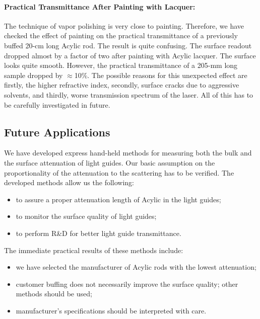 \paragraph{Practical Transmittance After Painting with Lacquer:}
The technique of vapor polishing is very close to painting.  Therefore, we have 
checked the effect of painting on the practical transmittance of a previously 
buffed 20-cm long Acylic rod.  The result is quite confusing.  The surface readout 
dropped almost by a factor of two after painting with Acylic lacquer.  The 
surface looks quite smooth.  However, the practical transmittance of a 205-mm long 
sample dropped by $\approx$10\%.  The possible reasons for this unexpected effect  
are firstly, the higher refractive index, secondly, surface cracks due to aggressive 
solvents, and thirdly, worse transmission spectrum of the laser.  All of this
has to be carefully investigated in future.

\subsection{Future Applications}
\label{CAO}

We have developed express hand-held methods for measuring both the bulk and the 
surface attenuation of light guides.  Our basic assumption on the proportionality 
of the attenuation to the scattering has to be verified.  The developed methods 
allow us the following:

\begin{itemize}
\item to assure a proper attenuation length of Acylic in the light guides;
\item to monitor the surface quality of light guides;
\item to perform R\&D for better light guide transmittance.
\end{itemize} 

The immediate practical results of these methods include:

\begin{itemize}
\item we have selected the manufacturer of Acylic rods with the lowest attenuation;
\item customer buffing does not necessarily improve the surface quality; other 
methods should be used;
\item manufacturer's specifications should be interpreted with care.
\end{itemize}

